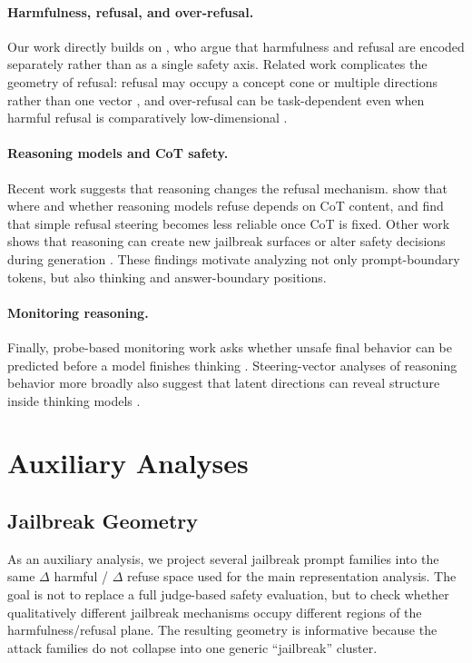 \documentclass[nohyperref]{article}
\theoremstyle{plain}
\theoremstyle{definition}
\theoremstyle{remark}
\begin{document}
\paragraph{Harmfulness, refusal, and over-refusal.} Our work directly builds on \citet{zhao2025harmfulness}, who argue that harmfulness and refusal are encoded separately rather than as a single safety axis. Related work complicates the geometry of refusal: refusal may occupy a concept cone or multiple directions rather than one vector \citep{wollschlager2025geometry, joad2026more}, and over-refusal can be task-dependent even when harmful refusal is comparatively low-dimensional \citep{wang2024surgical, maskey2026overrefusal}.

\paragraph{Reasoning models and CoT safety.} Recent work suggests that reasoning changes the refusal mechanism. \citet{yamaguchi2026where} show that where and whether reasoning models refuse depends on CoT content, and \citet{yang2026beyond} find that simple refusal steering becomes less reliable once CoT is fixed. Other work shows that reasoning can create new jailbreak surfaces or alter safety decisions during generation \citep{yong2026selfjailbreaking, zhao2026cothijacking, refusalcliff2025}. These findings motivate analyzing not only prompt-boundary tokens, but also thinking and answer-boundary positions.

\paragraph{Monitoring reasoning.} Finally, probe-based monitoring work asks whether unsafe final behavior can be predicted before a model finishes thinking \citep{predictalignment2025}. Steering-vector analyses of reasoning behavior more broadly also suggest that latent directions can reveal structure inside thinking models \citep{venhoff2025understanding}.


\appendix
\section{Auxiliary Analyses}

\subsection{Jailbreak Geometry}

As an auxiliary analysis, we project several jailbreak prompt families into the same $\Delta$ harmful / $\Delta$ refuse space used for the main representation analysis. The goal is not to replace a full judge-based safety evaluation, but to check whether qualitatively different jailbreak mechanisms occupy different regions of the harmfulness/refusal plane. The resulting geometry is informative because the attack families do not collapse into one generic ``jailbreak'' cluster.
\end{document}
